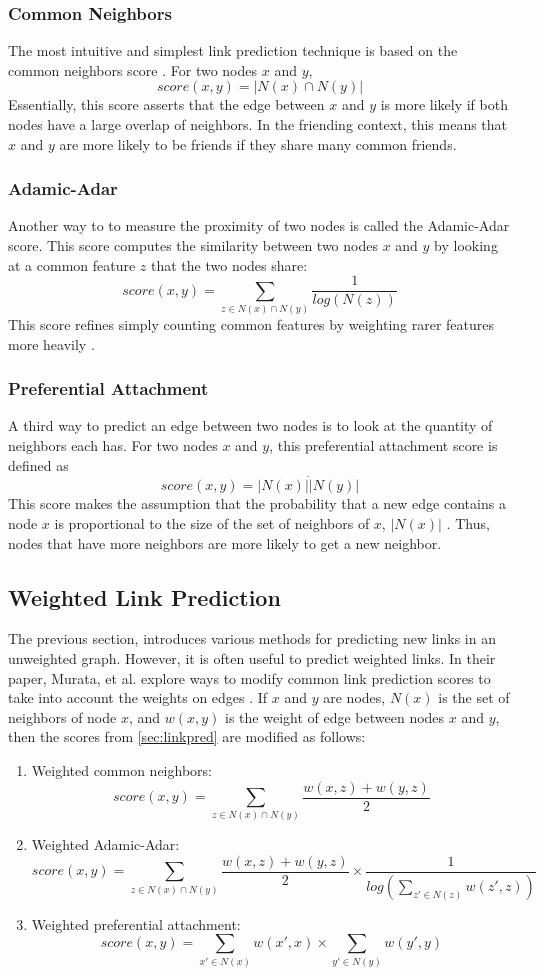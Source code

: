 \subsubsection{Common Neighbors}
The most intuitive and simplest link prediction technique is based on the common neighbors score \cite{linkpredintro}.  For two nodes $x$ and $y$, $$score(x,y) = |N(x) \cap N(y)|$$
Essentially, this score asserts that the edge between $x$ and $y$ is more likely if both nodes have a large overlap of neighbors.  In the friending context, this means that $x$ and $y$ are more likely to be friends if they share many common friends.
\subsubsection{Adamic-Adar}
Another way to to measure the proximity of two nodes is called the Adamic-Adar score.  This score computes the similarity between two nodes $x$ and $y$ by looking at a common feature $z$ that the two nodes share: $$score(x,y) = \sum_{z \in N(x) \cap N(y)} \frac{1}{log(N(z))}$$
This score refines simply counting common features by weighting rarer features more heavily \cite{linkpredintro}.
\subsubsection{Preferential Attachment}
A third way to predict an edge between two nodes is to look at the quantity of neighbors each has.  For two nodes $x$ and $y$, this preferential attachment score is defined as $$score(x, y) = |N(x)| \dot |N(y)|$$
This score makes the assumption that the probability that a new edge contains a node $x$ is proportional to the size of the set of neighbors of $x$, $|N(x)|$ \cite{linkpredintro}.  Thus, nodes that have more neighbors are more likely to get a new neighbor.

\subsection{Weighted Link Prediction} \label{sec:weightedlinkpred}
The previous section, introduces various methods for predicting new links in an unweighted graph.  However, it is often useful to predict weighted links.  In their paper, Murata, et al. explore ways to modify common link prediction scores to take into account the weights on edges \cite{weightedlinks}.  If $x$ and $y$ are nodes, $N(x)$ is the set of neighbors of node $x$, and $w(x,y)$ is the weight of edge between nodes $x$ and $y$, then the scores from \ref{sec:linkpred} are modified as follows:
\begin{enumerate}
	\item Weighted common neighbors: $$score(x,y) = \sum_{z \in N(x) \cap N(y)}  \frac{w(x,z) + w(y,z)}{2}$$
	\item Weighted Adamic-Adar: $$score(x,y) = \sum_{z \in N(x) \cap N(y)} \frac{w(x,z) + w(y,z)}{2} \times \frac{1}{log(\sum_{z' \in N(z)} w(z',z))}$$
	\item Weighted preferential attachment: $$score(x,y) = \sum_{x' \in N(x)} w(x',x) \times \sum_{y' \in N(y)} w(y', y)$$
\end{enumerate}


